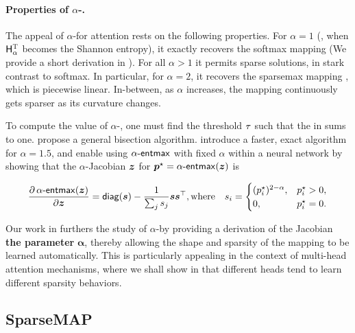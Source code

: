 \paragraph*{Properties of {\boldmath $\alpha$}-\entmaxtext.}
The appeal of $\alpha$-\entmaxtext for attention rests on the
following properties. For $\alpha=1$ (\ie, when $\mathsf{H}^{\textsc{T}}_\alpha$ becomes
the Shannon entropy), it exactly recovers the softmax mapping (We
provide a short derivation in ). For all $\alpha>1$
it permits sparse solutions, in stark contrast to softmax. In
particular, for $\alpha=2$, it recovers the sparsemax mapping
\citep{sparsemax}, which is piecewise linear. In-between, as $\alpha$
increases, the mapping continuously gets sparser as its curvature
changes.

To compute the value of $\alpha$-\entmaxtext, one must find the
threshold $\tau$ such that the \rhs in  sums
to one. \citet{blondel2019learning} propose a general bisection
algorithm. \citet{entmax} introduce a faster, exact algorithm for
$\alpha=1.5$, and enable using $\mathop{\mathsf{\alpha}\textnormal{-}\mathsf{entmax}}$ with fixed $\alpha$ within
a neural network by showing that the $\alpha$-\entmaxtext Jacobian
\wrt $\bm{z}$ for $\bm{p}^\star = \mathop{\mathsf{\alpha}\textnormal{-}\mathsf{entmax}}(\bm{z})$ is

\begin{equation}
    \begin{aligned}
        \frac{\partial \mathop{\mathsf{\alpha}\textnormal{-}\mathsf{entmax}}(\bm{z})}{\partial \bm{z}} = \operatorname*{\mathsf{diag}}(\bm{s}) - \frac{1}{\sum_j s_j} \bm{ss}^\top,
        \text{where}\quad s_i = \begin{cases}(p_i^\star)^{2-\alpha}, & p_i^\star > 0, \\
             0,                        & p_i^\star = 0. \\\end{cases}
    \end{aligned}
\end{equation}

Our work in  furthers the study of
$\alpha$-\entmaxtext by providing a derivation of the Jacobian {\bf
        \wrt the parameter} $\boldsymbol{\alpha}$, thereby allowing the shape
and sparsity of the mapping to be learned automatically. This is
particularly appealing in the context of multi-head attention
mechanisms, where we shall show in  that different
heads tend to learn different sparsity behaviors.

\subsection{SparseMAP}\label{sec:smap_bg}

